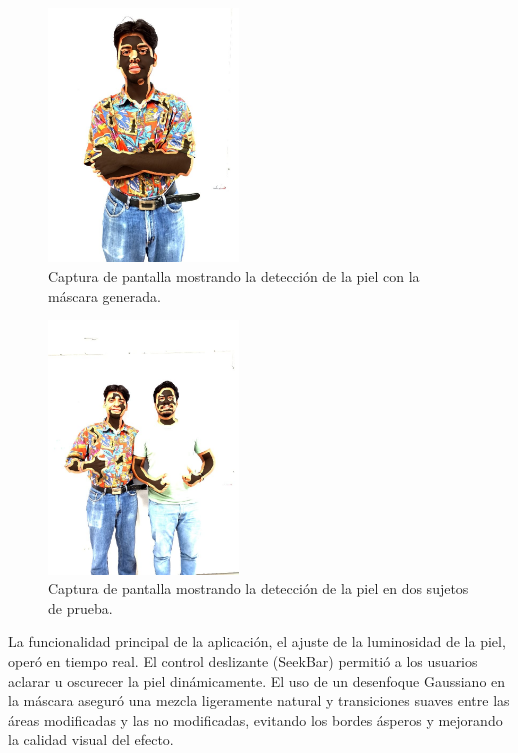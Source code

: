 \documentclass[conference]{IEEEtran}
\begin{document}
\begin{figure}[htbp]
\centering
\includegraphics[width=0.45\textwidth]{Imagenes/ejemplo_mascara_piel.jpg}
\caption{Captura de pantalla mostrando la detección de la piel con la máscara generada.}
\label{fig:mascara_piel}
\end{figure}

\begin{figure}[htbp]
\centering
\includegraphics[width=0.45\textwidth]{Imagenes/dos_sujetos.jpg}
\caption{Captura de pantalla mostrando la detección de la piel en dos sujetos de prueba.}
\label{fig:mascara_piel}
\end{figure}

La funcionalidad principal de la aplicación, el ajuste de la luminosidad de la piel, operó en tiempo real. El control deslizante (SeekBar) permitió a los usuarios aclarar u oscurecer la piel dinámicamente. El uso de un desenfoque Gaussiano en la máscara aseguró una mezcla ligeramente natural y transiciones suaves entre las áreas modificadas y las no modificadas, evitando los bordes ásperos y mejorando la calidad visual del efecto.
\end{document}
